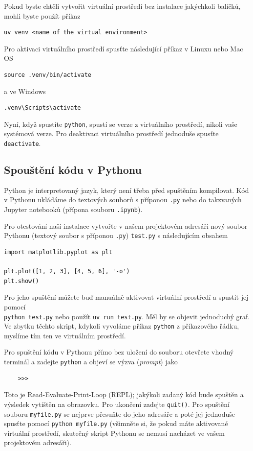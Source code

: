 Pokud byste chtěli vytvořit virtuální prostředí bez instalace jakýchkoli balíčků, mohli byste použít příkaz
\begin{lstlisting}
uv venv <name of the virtual environment>
\end{lstlisting}

Pro aktivaci virtuálního prostředí spusťte následující příkaz v Linuxu nebo Mac OS
\begin{lstlisting}
source .venv/bin/activate
\end{lstlisting}
a ve Windows
\begin{lstlisting}
.venv\Scripts\activate
\end{lstlisting}

Nyní, když spustíte \verb|python|, spustí se verze z virtuálního prostředí, nikoli vaše systémová verze. Pro deaktivaci virtuálního prostředí jednoduše spusťte \verb|deactivate|.

\subsection{Spouštění kódu v Pythonu}
Python je interpretovaný jazyk, který není třeba před spuštěním kompilovat. Kód v Pythonu ukládáme do textových souborů s příponou \verb|.py| nebo do takzvaných Jupyter notebooků (přípona souboru \verb|.ipynb|).

Pro otestování naší instalace vytvořte v našem projektovém adresáři nový soubor Pythonu (textový soubor s příponou \verb|.py|) \verb|test.py| s následujícím obsahem
\begin{lstlisting}
import matplotlib.pyplot as plt

plt.plot([1, 2, 3], [4, 5, 6], '-o')
plt.show()
\end{lstlisting}
Pro jeho spuštění můžete buď manuálně aktivovat virtuální prostředí a spustit jej pomocí\\
\verb|python test.py| nebo použít \verb|uv run test.py|. Měl by se objevit jednoduchý graf. Ve zbytku těchto skript, kdykoli vyvoláme příkaz \verb|python| z příkazového řádku, myslíme tím ten ve virtuálním prostředí.

Pro spuštění kódu v Pythonu přímo bez uložení do souboru otevřete vhodný terminál a zadejte \verb|python| a objeví se výzva (\emph{prompt}) jako
\begin{lstlisting}
    >>>
\end{lstlisting}
Toto je Read-Evaluate-Print-Loop (REPL); jakýkoli zadaný kód bude spuštěn a výsledek vytištěn na obrazovku. Pro ukončení zadejte \verb|quit()|. Pro spuštění souboru \verb|myfile.py| se nejprve přesuňte do jeho adresáře a poté jej jednoduše spusťte pomocí \verb|python myfile.py| (všimněte si, že pokud máte aktivované virtuální prostředí, skutečný skript Pythonu se nemusí nacházet ve vašem projektovém adresáři).

